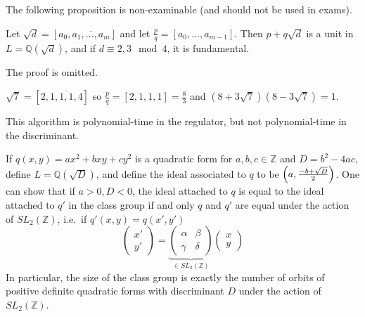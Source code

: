 The following proposition is non-examinable (and should not be used in exams).
\begin{proposition}
    Let \( \sqrt{d} = [a_0, \overline{a_1, \dots, a_m}] \) and let \( \frac{p}{q} = [a_0, \dots, a_{m-1}] \).
    Then \( p + q\sqrt{d} \) is a unit in \( L = \mathbb Q(\sqrt{d}) \), and if \( d \equiv 2, 3 \mod 4 \), it is fundamental.
\end{proposition}
The proof is omitted.
\begin{example}
    \( \sqrt{7} = [2,\overline{1,1,1,4}] \) so \( \frac{p}{q} = [2,1,1,1] = \frac{8}{3} \) and \( (8 + 3\sqrt{7})(8 - 3\sqrt{7}) = 1 \).
\end{example}
This algorithm is polynomial-time in the regulator, but not polynomial-time in the discriminant.

If \( q(x,y) = ax^2 + bxy + cy^2 \) is a quadratic form for \( a, b, c \in \mathbb Z \) and \( D = b^2 - 4ac \), define \( L = \mathbb Q(\sqrt{D}) \), and define the ideal associated to \( q \) to be \( \qty(a, \frac{-b+\sqrt{D}}{2}) \).
One can show that if \( a > 0, D < 0 \), the ideal attached to \( q \) is equal to the ideal attached to \( q' \) in the class group if and only \( q \) and \( q' \) are equal under the action of \( SL_2(\mathbb Z) \), i.e.\ if \( q'(x,y) = q(x',y') \)
\[ \begin{pmatrix}
    x' \\ y'
\end{pmatrix} = \underbrace{\begin{pmatrix}
    \alpha & \beta \\
    \gamma & \delta
\end{pmatrix}}_{\in SL_2(\mathbb Z)} \begin{pmatrix}
    x \\ y
\end{pmatrix} \]
In particular, the size of the class group is exactly the number of orbits of positive definite quadratic forms with discriminant \( D \) under the action of \( SL_2(\mathbb Z) \).
